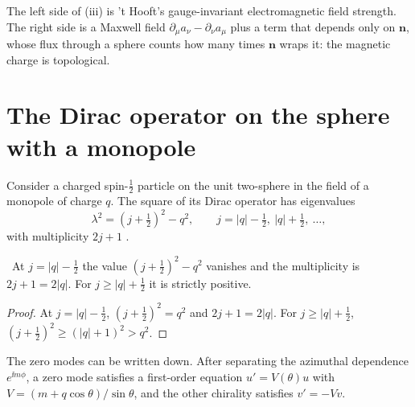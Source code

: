 The left side of (iii) is 't Hooft's gauge-invariant electromagnetic field strength. The right side is a Maxwell field $\partial_\mu a_\nu-\partial_\nu a_\mu$ plus a term that depends only on $\mathbf n$, whose flux through a sphere counts how many times $\mathbf n$ wraps it: the magnetic charge is topological.

\section{The Dirac operator on the sphere with a monopole}

Consider a charged spin-$\frac12$ particle on the unit two-sphere in the field of a monopole of charge $q$. The square of its Dirac operator has eigenvalues
\begin{equation}\label{eq:monopolespec}
\lambda^2=(j+\tfrac12)^2-q^2,\qquad j=|q|-\tfrac12,\ |q|+\tfrac12,\ \dots,
\end{equation}
with multiplicity $2j+1$ \cite{KazamaYangGoldhaber1977}.

\begin{proposition}\label{prop:monopolespec}\ver\
At $j=|q|-\frac12$ the value $(j+\frac12)^2-q^2$ vanishes and the multiplicity is $2j+1=2|q|$. For $j\ge|q|+\frac12$ it is strictly positive.
\end{proposition}
\begin{proof}
At $j=|q|-\frac12$, $(j+\frac12)^2=q^2$ and $2j+1=2|q|$. For $j\ge|q|+\frac12$, $(j+\frac12)^2\ge(|q|+1)^2>q^2$.
\end{proof}


The zero modes can be written down. After separating the azimuthal dependence $e^{\ii m\phi}$, a zero mode satisfies a first-order equation $u'=V(\theta)u$ with $V=(m+q\cos\theta)/\sin\theta$, and the other chirality satisfies $v'=-Vv$.


